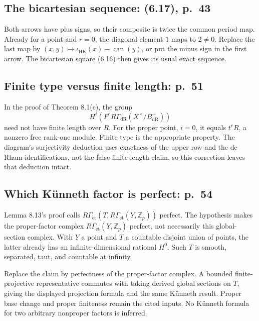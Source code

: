 \documentclass[10pt]{article}
\begin{document}
\subsection*{The bicartesian sequence: (6.17), p. 43}
Both arrows have plus signs, so their composite is twice the common period map. Already for a point and \(r=0\), the diagonal element \(1\) maps to \(2\ne0\). Replace the last map by \((x,y)\mapsto\iota_{\mathrm{HK}}(x)-\operatorname{can}(y)\), or put the minus sign in the first arrow. The bicartesian square (6.16) then gives its usual exact sequence.\par
\subsection*{Finite type versus finite length: p. 51}
In the proof of Theorem 8.1(c), the group \[H^i(F^rR\Gamma_{\mathrm{dR}}(X^\times/B_{\mathrm{dR}}^+))\] need not have finite length over \(R\). For the proper point, \(i=0\), it equals \(t^rR\), a nonzero free rank-one module. Finite type is the appropriate property. The diagram’s surjectivity deduction uses exactness of the upper row and the de Rham identifications, not the false finite-length claim, so this correction leaves that deduction intact.\par
\subsection*{Which Künneth factor is perfect: p. 54}
Lemma 8.13’s proof calls \(R\Gamma_{\mathrm{\acute et}}(T,R\Gamma_{\mathrm{\acute et}}(Y,\mathbb Z_p))\) perfect. The hypothesis makes the proper-factor complex \(R\Gamma_{\mathrm{\acute et}}(Y,\mathbb Z_p)\) perfect, not necessarily this global-section complex. With \(Y\) a point and \(T\) a countable disjoint union of points, the latter already has an infinite-dimensional rational \(H^0\). Such \(T\) is smooth, separated, taut, and countable at infinity.\par
Replace the claim by perfectness of the proper-factor complex. A bounded finite-projective representative commutes with taking derived global sections on \(T\), giving the displayed projection formula and the same Künneth result. Proper base change and proper finiteness remain the cited inputs. No Künneth formula for two arbitrary nonproper factors is inferred.\par
\end{document}
